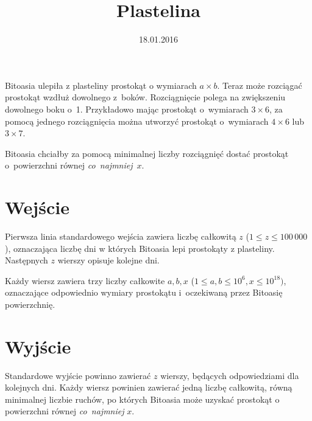 \documentclass[zad,zawodnik,utf8]{sinol}
\title{Plastelina}
\author{} %
\date{18.01.2016}
\begin{document}
  \begin{tasktext}%
Bitoasia ulepiła z plasteliny prostokąt o wymiarach $a \times b$. Teraz może rozciągać prostokąt wzdłuż dowolnego z~boków. Rozciągnięcie polega na zwiększeniu dowolnego boku o~1. Przykładowo mając prostokąt o~wymiarach $3 \times 6$, za pomocą jednego rozciągnięcia można utworzyć prostokąt o~wymiarach $4 \times 6$ lub $3 \times 7$. 

Bitoasia chciałby za pomocą minimalnej liczby rozciągnięć dostać prostokąt o~powierzchni równej \textit{co~najmniej}~$x$.
 
  \section{Wejście}
 Pierwsza linia standardowego wejścia zawiera liczbę całkowitą $z$ ($1 \leq z \leq 100\,000$), oznaczająca liczbę dni w których Bitoasia lepi prostokąty z plasteliny. Następnych $z$ wierszy opisuje kolejne dni.

Każdy wiersz zawiera trzy liczby całkowite $a, b, x$ ($1 \leq a, b \leq 10^6, x \leq 10^{18})$, oznaczające odpowiednio wymiary prostokątu i~oczekiwaną przez Bitoasię powierzchnię.

  \section{Wyjście}
Standardowe wyjście powinno zawierać $z$ wierszy, będących odpowiedziami dla kolejnych dni. Każdy wiersz powinien zawierać jedną liczbę całkowitą, równą minimalnej liczbie ruchów, po których Bitoasia może uzyskać prostokąt o powierzchni równej \textit{co~najmniej} $x$.

     \makestandardexample

  \end{tasktext}
\end{document}
